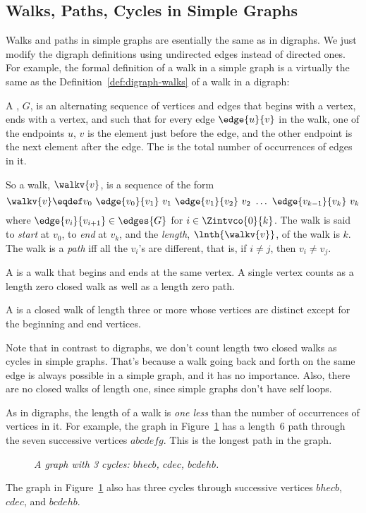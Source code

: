 \subsection{Walks, Paths, Cycles in Simple Graphs}
Walks and paths in simple graphs are esentially the same as in digraphs.
We just modify the digraph definitions using undirected edges instead of directed
ones.  For example, the formal definition of a walk in a simple graph is a virtually
the same as the Definition~\ref{def:digraph-walks} of a walk in a digraph:

\begin{definition}\label{def:simplegraph-walks}
A , $G$, is an alternating sequence of
vertices and edges that begins with a vertex, ends with a vertex, and
such that for every edge $\edge{u}{v}$ in the walk, one of the
endpoints $u$, $v$ is the element just before the edge, and the other
endpoint is the next element after the edge.  The  is the total number of occurrences of edges in it.

So a walk, $\walkv{v}$, is a sequence of the form
\[
\walkv{v} \eqdef v_0\ \edge{v_0}{v_1}\
v_1\  \edge{v_1}{v_2}\  v_2\  \dots\  \edge{v_{k-1}}{v_k}\  v_k
\]
where $\edge{v_i}{v_{i+1}} \in \edges{G}$ for $i \in \Zintvco{0}{k}$.
  The walk is said to \emph{start} at $v_0$, to \emph{end} at $v_k$,
  and the \emph{length}, $\lnth{\walkv{v}}$, of the walk is
  $k$.  The walk is a \emph{path} iff all the $v_i$'s are different,
  that is, if $i \neq j$, then $v_i \neq v_j$.

A  is a walk that begins and ends at the same
vertex.  A single vertex counts as a length zero closed walk as well
as a length zero path.

A  is a closed walk of length three or more whose
vertices are distinct except for the beginning and end vertices.
\end{definition}
Note that in contrast to digraphs, we don't count length two closed
walks as cycles in simple graphs.  That's because a walk going back
and forth on the same edge is always possible in a simple graph, and
it has no importance.  Also, there are no closed walks of length one,
since simple graphs don't have self loops.

As in digraphs, the length of a walk is \emph{one less} than the
number of occurrences of vertices in it.  For example, the graph in
Figure~\ref{dg} has a length~6 path through the seven successive
vertices $abcdefg$.  This is the longest path in the graph.
\begin{figure}
\caption{\em A graph with 3 cycles: $bhecb$,
$cdec$, $bcdehb$.}
\label{dg}
\end{figure}
The graph in Figure~\ref{dg} also has three cycles through successive vertices $bhecb$,
$cdec$, and $bcdehb$.


